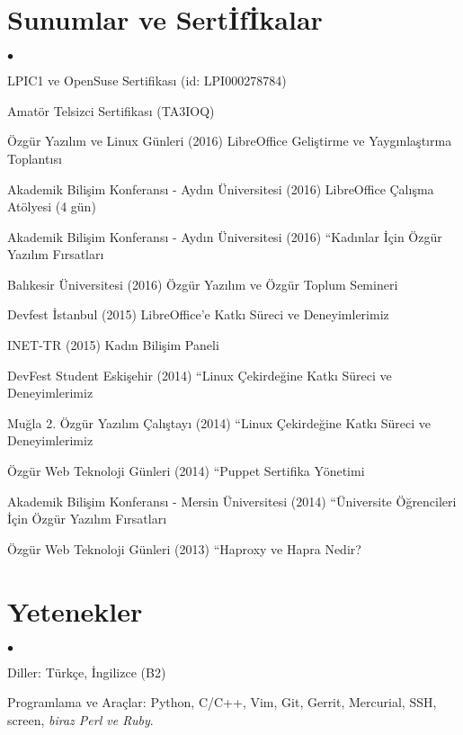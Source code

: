 \documentclass[margin,line]{res}
\newenvironment{list2}{
  \begin{list}{$\bullet$}{%
      \setlength{\itemsep}{0in}
      \setlength{\parsep}{0in} \setlength{\parskip}{0in}
      \setlength{\topsep}{0in} \setlength{\partopsep}{0in}
      \setlength{\leftmargin}{0.1in}}}{\end{list}}
\begin{document}
\begin{resume}
\section{\sc Sunumlar ve Sert\.{I}f\.{I}kalar}
\begin{list2}
\item LPIC1 ve OpenSuse Sertifikas{\i} (id: LPI000278784)
\item Amat\"{o}r Telsizci Sertifikas{\i} (TA3IOQ)
\item \"{O}zg\"{u}r Yaz{\i}l{\i}m ve Linux G\"{u}nleri (2016) 	LibreOffice Geli\c{s}tirme ve Yayg{\i}nla\c{s}t{\i}rma Toplant{\i}s{\i}
\item Akademik Bili\c{s}im Konferans{\i} - Ayd{\i}n \"{U}niversitesi (2016) LibreOffice \c{C}al{\i}\c{s}ma At\"{o}lyesi (4 g\"{u}n)
\item Akademik Bili\c{s}im Konferans{\i} - Ayd{\i}n \"{U}niversitesi (2016) “Kad{\i}nlar \.{I}\c{c}in \"{O}zg\"{u}r Yaz{\i}l{\i}m F{\i}rsatlar{\i}
\item Bal{\i}kesir \"{U}niversitesi (2016) \"{O}zg\"{u}r Yaz{\i}l{\i}m ve \"{O}zg\"{u}r Toplum Semineri
\item Devfest \.{I}stanbul (2015) LibreOffice'e Katk{\i} S\"{u}reci ve Deneyimlerimiz
\item INET-TR (2015) Kad{\i}n Bili\c{s}im Paneli 
\item DevFest Student Eski\c{s}ehir (2014) “Linux \c{C}ekirde\u{g}ine Katk{\i} S\"{u}reci ve Deneyimlerimiz
\item Mu\u{g}la 2. \"{O}zg\"{u}r Yaz{\i}l{\i}m \c{C}al{\i}\c{s}tay{\i} (2014) “Linux \c{C}ekirde\u{g}ine Katk{\i} S\"{u}reci ve Deneyimlerimiz
\item \"{O}zg\"{u}r Web Teknoloji G\"{u}nleri (2014) “Puppet Sertifika Y\"{o}netimi
\item Akademik Bili\c{s}im Konferans{\i} - Mersin \"{U}niversitesi (2014) “\"{U}niversite \"{O}\u{g}rencileri \.{I}\c{c}in \"{O}zg\"{u}r Yaz{\i}l{\i}m F{\i}rsatlar{\i}
\item \"{O}zg\"{u}r Web Teknoloji G\"{u}nleri (2013) “Haproxy ve Hapra Nedir?
\end{list2}
\vspace{-.3cm}

\section{\sc Yetenekler}
\begin{list2}
\item Diller: T\"{u}rk\c{c}e, \.{I}ngilizce (B2)
\item Programlama ve Ara\c{c}lar: Python, C/C++, Vim, Git, Gerrit, Mercurial, SSH, screen, {\em biraz Perl ve Ruby}.
\end{list2}


\end{resume}
\end{document}
